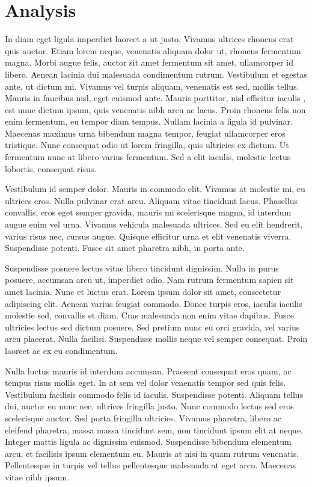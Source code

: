 \documentclass[11pt,a4paper]{article}
\begin{document}
\section{Analysis}

In diam eget ligula imperdiet laoreet a ut justo. Vivamus ultrices rhoncus erat quis auctor. Etiam lorem neque, venenatis aliquam dolor ut, rhoncus fermentum magna. Morbi augue felis, auctor sit amet fermentum sit amet, ullamcorper id libero. Aenean lacinia dui malesuada condimentum rutrum. Vestibulum et egestas ante, ut dictum mi. Vivamus vel turpis aliquam, venenatis est sed, mollis tellus. Mauris in faucibus nisl, eget euismod ante. Mauris porttitor, nisl efficitur iaculis \cite{BBD2016}, est nunc dictum ipsum, quis venenatis nibh arcu ac lacus. Proin rhoncus felis non enim fermentum, eu tempor diam tempus. Nullam lacinia a ligula id pulvinar. Maecenas maximus urna bibendum magna tempor, feugiat ullamcorper eros tristique. Nunc consequat odio ut lorem fringilla, quis ultricies ex dictum. Ut fermentum nunc at libero varius fermentum. Sed a elit iaculis, molestie lectus lobortis, consequat risus.

Vestibulum id semper dolor. Mauris in commodo elit. Vivamus at molestie mi, eu ultrices eros. Nulla pulvinar erat arcu. Aliquam vitae tincidunt lacus. Phasellus convallis, eros eget semper gravida, mauris mi scelerisque magna, id interdum augue enim vel urna. Vivamus vehicula malesuada ultrices. Sed eu elit hendrerit, varius risus nec, cursus augue. Quisque efficitur urna et elit venenatis viverra. Suspendisse potenti. Fusce sit amet pharetra nibh, in porta ante.

Suspendisse posuere lectus vitae libero tincidunt dignissim. Nulla in purus posuere, accumsan arcu ut, imperdiet odio. Nam rutrum fermentum sapien sit amet lacinia. Nunc et luctus erat. Lorem ipsum dolor sit amet, consectetur adipiscing elit. Aenean varius feugiat commodo. Donec turpis eros, iaculis iaculis molestie sed, convallis et diam. Cras malesuada non enim vitae dapibus. Fusce ultricies lectus sed dictum posuere. Sed pretium nunc eu orci gravida, vel varius arcu placerat. Nulla facilisi. Suspendisse mollis neque vel semper consequat. Proin laoreet ac ex eu condimentum.

Nulla luctus mauris id interdum accumsan. Praesent consequat eros quam, ac tempus risus mollis eget. In at sem vel dolor venenatis tempor sed quis felis. Vestibulum facilisis commodo felis id iaculis. Suspendisse potenti. Aliquam tellus dui, auctor eu nunc nec, ultrices fringilla justo. Nunc commodo lectus sed eros scelerisque auctor. Sed porta fringilla ultricies. Vivamus pharetra, libero ac eleifend pharetra, massa massa tincidunt sem, non tincidunt ipsum elit at neque. Integer mattis ligula ac dignissim euismod. Suspendisse bibendum elementum arcu, et facilisis ipsum elementum eu. Mauris at nisi in quam rutrum venenatis. Pellentesque in turpis vel tellus pellentesque malesuada at eget arcu. Maecenas vitae nibh ipsum.
\end{document}
